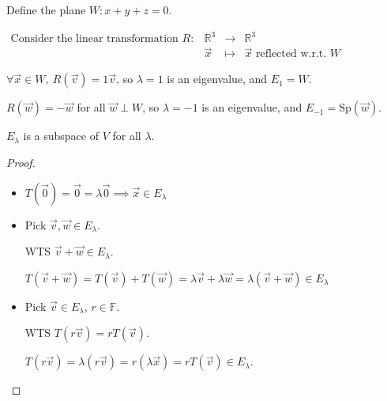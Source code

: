 \documentclass[11pt,fleqn]{book} %
\begin{document}
\begin{example}
    Define the plane $W: x + y + z = 0$.

    $\begin{matrix} \text{Consider the linear transformation }R: &\mathbb{R}^3 &\to &\mathbb{R}^3 \\ &\overrightarrow{x} &\mapsto &\overrightarrow{x}\text{ reflected w.r.t. }W \end{matrix}$

    $\forall \overrightarrow{x} \in W,~R(\overrightarrow{v}) = 1\overrightarrow{v}$, so $\lambda = 1$ is an eigenvalue, and $E_1 = W$.

    $R(\overrightarrow{w}) = -\overrightarrow{w}$ for all $\overrightarrow{w} \perp W$, so $\lambda = -1$ is an eigenvalue, and $E_{-1} = \mathrm{Sp}(\overrightarrow{w})$.
\end{example}


\setcounter{chapter}{4}
\setcounter{dummy}{6}
\begin{proposition}
$E_\lambda$ is a subspace of $V$ for all $\lambda$.
\end{proposition}
\setcounter{chapter}{3}

\begin{proof}
    \begin{itemize}
        \item $T(\overrightarrow{0}) = \overrightarrow{0} = \lambda\overrightarrow{0} \implies \overrightarrow{x} \in E_\lambda$

        \item Pick $\overrightarrow{v}, \overrightarrow{w} \in E_\lambda$.

        WTS $\overrightarrow{v} + \overrightarrow{w} \in E_\lambda$.

        $T(\overrightarrow{v} + \overrightarrow{w}) = T(\overrightarrow{v}) + T(\overrightarrow{w}) = \lambda\overrightarrow{v} + \lambda \overrightarrow{w} = \lambda(\overrightarrow{v} + \overrightarrow{w}) \in E_\lambda$

        \item Pick $\overrightarrow{v} \in E_\lambda$, $r \in \mathbb{F}$.

        WTS $T(r\overrightarrow{v}) = rT(\overrightarrow{v})$.

        $T(r\overrightarrow{v}) = \lambda(r\overrightarrow{v}) = r(\lambda\overrightarrow{x}) = rT(\overrightarrow{v}) \in E_\lambda$.
    \end{itemize}
\end{proof}
\end{document}
